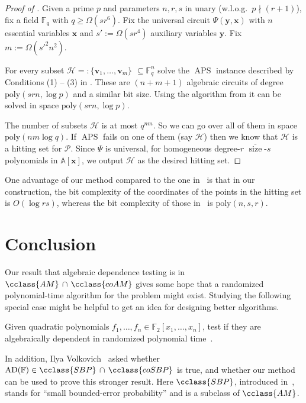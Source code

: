 \documentclass{toc}
\newcommand{\F}{\mathbb{F}}
\newcommand{\calH}{\mathcal{H}}
\newcommand{\calP}{\mathcal{P}}
\newcommand{\aff}{\mathbb{A}}
\DeclareMathOperator{\sz}{\mathrm{size}}
\newcommand{\ol}[1]{\overline{#1}}
\newcommand{\AM}{\cclass{AM}\xspace}  %
\newcommand{\coAM}{\cclass{coAM}\xspace}  %
\newcommand{\AMcapcoAM}{\AM\,\cap\,\coAM}  %
\newcommand{\SBP}{\cclass{SBP}\xspace}  %
\newcommand{\coSBP}{\cclass{coSBP}\xspace}  %
\newcommand{\SBPcapcoSBP}{\SBP\,\cap\,\coSBP}  %
\DeclareMathOperator{\AD}{\mathrm{AD}\xspace} %
\DeclareMathOperator{\APS}{\mathrm{APS}\xspace} %
\begin{document}
\begin{proof}[Proof of ]
Given a prime $p$ and parameters $n, r, s$ in unary (w.l.o.g.\ $p\nmid(r+1)$), fix a field $\F_q$ with $q\ge\Omega(sr^6)$. Fix the universal circuit $\Psi(\mathbf{y},\mathbf{x})$ with $n$ essential variables $\mathbf{x}$ and $s':=\Omega(sr^4)$ auxiliary variables $\mathbf y$. Fix $m:=\Omega(s'^2n^2)$.

For every subset $\calH=:\{\mathbf v_1,\ldots, \mathbf v_m\}$ $\subseteq \F_q^n$ solve the $\APS$ instance described by 
Conditions 
%
(1) -- (3) %
in . These are $(n+m+1)$ algebraic circuits of degree 
%
$\mathrm{poly}(srn, \log p)$ and a similar bit size. %
Using the algorithm from  it can be solved in 
%
space $\mathrm{poly}(srn, \log p)$. %

The number of subsets $\calH$ is 
at most %
$q^{nm}$. 
%
So we can go over all of them in space $\mathrm{poly}(nm\log q)$. %
If $\APS$ fails on one of them (say $\calH$) then we know that $\calH$ is a hitting set for $\calP$. Since $\Psi$ is universal, for homogeneous degree-$r$ $\ol{\sz}$-$s$ polynomials in $\aff[\mathbf x]$, we output $\calH$ as the desired hitting set.
\end{proof}

%
\begin{remark}   %
One advantage of our method compared to the one in~\cite{forbes2017pspace} is that
%
in our construction, the 
%
bit complexity of the coordinates of the points in the hitting set %
is $O(\log rs)$, whereas the
%
bit complexity of those in~\cite{forbes2017pspace} is  $\mathrm{poly}(n,s,r)$. %
\end{remark}

%
\section{Conclusion}\label{sec-conclusion}
%

Our result
%
that  %
algebraic dependence testing
is  %
in
%
$\AMcapcoAM$   %
gives
%
%
some hope   %
that a randomized
%
polynomial-time   %
algorithm for the problem
%
might exist.  %
Studying the following special case might be helpful to get an idea for designing better algorithms.

  Given quadratic polynomials $f_1,\ldots,f_n \in \F_2[x_1,\ldots,x_n]$, test if they are algebraically dependent in randomized polynomial time~\cite{pandey2016algebraic}.
  
 
In addition, Ilya Volkovich~\cite{Vol18} asked
%
%
%
%
whether $\AD(\F) \in \SBPcapcoSBP$ is true, and whether our method can be used to prove this stronger result. %
%
%
%
%
Here
%
%
%
%
$\SBP$, introduced in~\cite{BCM06},  %
stands for ``small bounded-error probability'' and is a subclass of $\AM$. %
\end{document}
